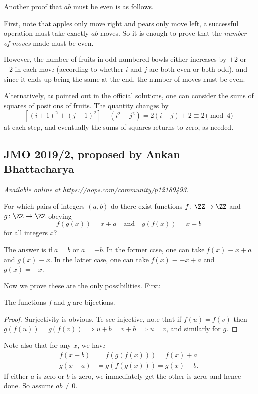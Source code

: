 \documentclass[11pt]{scrartcl}
\begin{document}
\begin{remark*}
Another proof that $ab$ must be even
is as follows.

First, note that apples only move right and pears only move left,
a successful operation must take exactly $ab$ moves.
So it is enough to prove that the \emph{number of moves}
made must be even.

However, the number of fruits in odd-numbered bowls
either increases by $+2$ or $-2$ in each move
(according to whether $i$ and $j$ are both even or both odd),
and since it ends up being the same at the end,
the number of moves must be even.

Alternatively, as pointed out in the official solutions,
one can consider the sums of squares of positions of fruits.
The quantity changes by
\[ \left[ (i+1)^2 + (j-1)^2 \right] - (i^2+j^2)
  = 2(i-j) + 2 \equiv 2 \pmod 4 \]
at each step,
and eventually the sums of squares returns to zero, as needed.
\end{remark*}
\pagebreak

\subsection{JMO 2019/2, proposed by Ankan Bhattacharya}
\textsl{Available online at \url{https://aops.com/community/p12189493}.}
\begin{mdframed}[style=mdpurplebox,frametitle={Problem statement}]
For which pairs of integers $(a, b)$ do there exist functions
$f\colon \ZZ \to \ZZ$ and $g \colon \ZZ \to \ZZ$ obeying
\[ f(g(x)) = x + a \quad \text{and} \quad g(f(x)) = x + b \]
for all integers $x$?
\end{mdframed}
The answer is if $a=b$ or $a=-b$.
In the former case, one can take $f(x) \equiv x+a$ and $g(x) \equiv x$.
In the latter case, one can take $f(x) \equiv -x+a$ and $g(x) = -x$.

Now we prove these are the only possibilities.
First:
\begin{claim*}
  The functions $f$ and $g$ are bijections.
\end{claim*}
\begin{proof}
  Surjectivity is obvious.
  To see injective, note that if $f(u) = f(v)$
  then $g(f(u)) = g(f(v)) \implies u+b = v+b \implies u=v$,
  and similarly for $g$.
\end{proof}

Note also that for any $x$, we have
\begin{align*}
  f(x+b) &= f(g(f(x))) = f(x) + a \\
  g(x+a) &= g(f(g(x))) = g(x) + b.
\end{align*}
If either $a$ is zero or $b$ is zero,
we immediately get the other is zero, and hence done.
So assume $ab \neq 0$.
\end{document}
